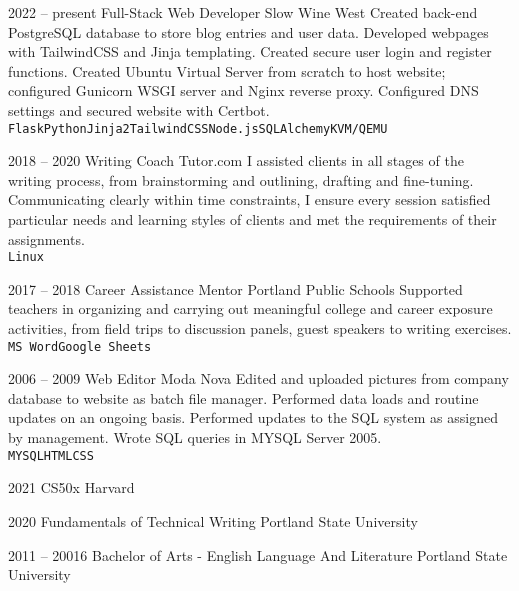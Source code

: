 \documentclass[9pt]{developercv} %
\begin{document}
\begin{entrylist}
		\entry
		{2022 -- present}
		{Full-Stack Web Developer}
		{Slow Wine West}
		{Created back-end PostgreSQL database to store blog entries and user data. Developed webpages with TailwindCSS and
		Jinja templating. Created secure user login and register functions. Created Ubuntu Virtual Server from scratch to host
		website; configured Gunicorn WSGI server and Nginx reverse proxy. Configured DNS settings and secured website with 
		Certbot.
		\\ \texttt{Flask}\slashsep\texttt{Python}\slashsep\texttt{Jinja2}\slashsep\texttt{TailwindCSS}\slashsep\texttt{Node.js}\slashsep\texttt{SQLAlchemy}\slashsep\texttt{KVM/QEMU}}
		
	\entry
		{2018 -- 2020}
		{Writing Coach}
		{Tutor.com}
		{I assisted clients in all stages of the writing process, from
		brainstorming and outlining, drafting and fine-tuning. Communicating clearly
		within time constraints, I ensure every session satisfied particular needs and
		learning styles of clients and met the requirements of their assignments.
		\\ \texttt{Linux}}

	\entry
		{2017 -- 2018}
		{Career Assistance Mentor}
		{Portland Public Schools}
		{Supported teachers in organizing and carrying out meaningful college and
		career exposure activities, from field trips to discussion panels, guest
		speakers to writing exercises.
		\\ \texttt{MS Word}\slashsep\texttt{Google Sheets}}
		
	\entry
		{2006 -- 2009}
		{Web Editor}
		{Moda Nova}
		{Edited and uploaded pictures from company database to website as batch file manager. Performed data loads and routine updates on an ongoing basis. 
		Performed updates to the SQL system as assigned by management.		
		Wrote SQL queries in MYSQL Server 2005.
		\\ \texttt{MYSQL}\slashsep\texttt{HTML}\slashsep\texttt{CSS}}
\end{entrylist}



\begin{entrylist}
	\entry
		{2021}
		{CS50x}
		{Harvard}
		
	\entry
		{2020}
		{Fundamentals of Technical Writing}
		{Portland State University}

	\entry
		{2011 -- 20016}
		{Bachelor of Arts - English Language And Literature}
		{Portland State University}

\end{entrylist}
\end{document}

